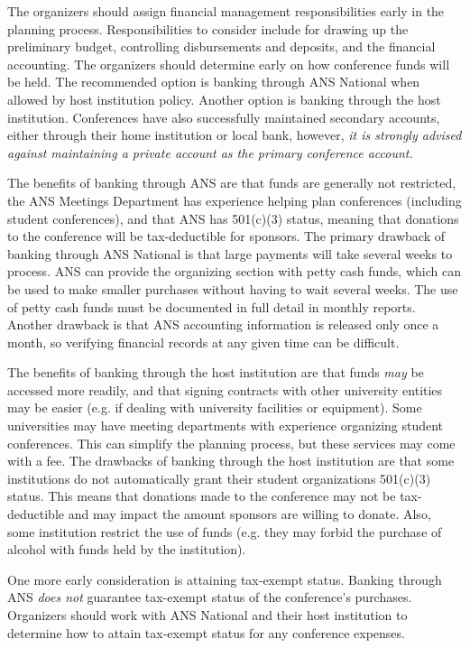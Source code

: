 \documentclass[12pt]{article}
\begin{document}
The organizers should assign financial management responsibilities early in the planning process.
Responsibilities to consider include for drawing up the preliminary budget, controlling disbursements and deposits, and the financial accounting.
The organizers should determine early on how conference funds will be held.
The recommended option is banking through ANS National when allowed by host institution policy.
Another option is banking through the host institution.
Conferences have also successfully maintained secondary accounts, either through their home institution or local bank, however, \emph{it is strongly advised against maintaining a private account as the primary conference account.}

The benefits of banking through ANS are that funds are generally not restricted, the ANS Meetings Department has experience helping plan conferences (including student conferences), and that ANS has 501(c)(3) status, meaning that donations to the conference will be tax-deductible for sponsors.
The primary drawback of banking through ANS National is that large payments will take several weeks to process.
ANS can provide the organizing section with petty cash funds, which can be used to make smaller purchases without having to wait several weeks.
The use of petty cash funds must be documented in full detail in monthly reports.
Another drawback is that ANS accounting information is released only once a month, so verifying financial records at any given time can be difficult.

The benefits of banking through the host institution are that funds \emph{may} be accessed more readily, and that signing contracts with other university entities may be easier  (e.g. if dealing with university facilities or equipment).
Some universities may have meeting departments with experience organizing student conferences.
This can simplify the planning process, but these services may come with a fee.
The drawbacks of banking through the host institution are that some institutions do not automatically grant their student organizations 501(c)(3) status.
This means that donations made to the conference may not be tax-deductible and may impact the amount sponsors are willing to donate.
Also, some institution restrict the use of funds (e.g. they may forbid the purchase of alcohol with funds held by the institution).

One more early consideration is attaining tax-exempt status.
Banking through ANS \emph{does not} guarantee tax-exempt status of the conference's purchases.
Organizers should work with ANS National and their host institution to determine how to attain tax-exempt status for any conference expenses.
\end{document}
